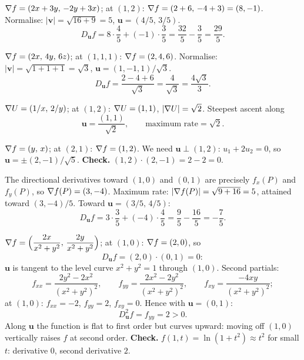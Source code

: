 \begin{solutions}
  \item $\nabla f=(2x+3y,\,-2y+3x)$; at $(1,2)$:
        $\nabla f=(2+6,\,-4+3)=(8,-1)$. Normalise:
        $|\mathbf{v}|=\sqrt{16+9}=5$, $\mathbf{u}=(4/5,\,3/5)$.
        \[
          D_{\mathbf{u}}f=8\cdot\frac{4}{5}+(-1)\cdot\frac{3}{5}
            =\frac{32}{5}-\frac{3}{5}=\frac{29}{5} .
        \]

  \item $\nabla f=(2x,\,4y,\,6z)$; at $(1,1,1)$: $\nabla f=(2,4,6)$.
        Normalise: $|\mathbf{v}|=\sqrt{1+1+1}=\sqrt{3}$,
        $\mathbf{u}=(1,-1,1)/\sqrt{3}$.
        \[
          D_{\mathbf{u}}f=\frac{2-4+6}{\sqrt{3}}
            =\frac{4}{\sqrt{3}}=\frac{4\sqrt{3}}{3} .
        \]

  \item $\nabla U=(1/x,\,2/y)$; at $(1,2)$: $\nabla U=(1,1)$,
        $|\nabla U|=\sqrt{2}$. Steepest ascent along
        \[
          \mathbf{u}=\frac{(1,1)}{\sqrt{2}},\qquad
          \text{maximum rate}=\sqrt{2} .
        \]

  \item $\nabla f=(y,\,x)$; at $(2,1)$: $\nabla f=(1,2)$. We need
        $\mathbf{u}\perp(1,2)$: $u_{1}+2u_{2}=0$, so
        $\mathbf{u}=\pm(2,-1)/\sqrt{5}$.
        \textbf{Check.} $(1,2)\cdot(2,-1)=2-2=0$. \checkmark

  \item The directional derivatives toward $(1,0)$ and $(0,1)$ are
        precisely $f_{x}(P)$ and $f_{y}(P)$, so $\nabla f(P)=(3,-4)$.
        Maximum rate: $|\nabla f(P)|=\sqrt{9+16}=5$, attained toward
        $(3,-4)/5$. Toward $\mathbf{u}=(3/5,\,4/5)$:
        \[
          D_{\mathbf{u}}f=3\cdot\frac{3}{5}+(-4)\cdot\frac{4}{5}
            =\frac{9}{5}-\frac{16}{5}=-\frac{7}{5} .
        \]

  \item $\nabla f=\Bigl(\dfrac{2x}{x^{2}+y^{2}},\,
        \dfrac{2y}{x^{2}+y^{2}}\Bigr)$; at $(1,0)$: $\nabla f=(2,0)$, so
        \[
          D_{\mathbf{u}}f=(2,0)\cdot(0,1)=0 :
        \]
        $\mathbf{u}$ is tangent to the level curve $x^{2}+y^{2}=1$
        through $(1,0)$. Second partials:
        \[
          f_{xx}=\frac{2y^{2}-2x^{2}}{(x^{2}+y^{2})^{2}},\qquad
          f_{yy}=\frac{2x^{2}-2y^{2}}{(x^{2}+y^{2})^{2}},\qquad
          f_{xy}=\frac{-4xy}{(x^{2}+y^{2})^{2}} ;
        \]
        at $(1,0)$: $f_{xx}=-2$, $f_{yy}=2$, $f_{xy}=0$. Hence with
        $\mathbf{u}=(0,1)$:
        \[
          D^{2}_{\mathbf{u}}f=f_{yy}=2>0 .
        \]
        Along $\mathbf{u}$ the function is flat to first order but
        curves upward: moving off $(1,0)$ vertically raises $f$ at
        second order. \textbf{Check.}
        $f(1,t)=\ln(1+t^{2})\approx t^{2}$ for small $t$: derivative
        $0$, second derivative $2$. \checkmark


\end{solutions}
